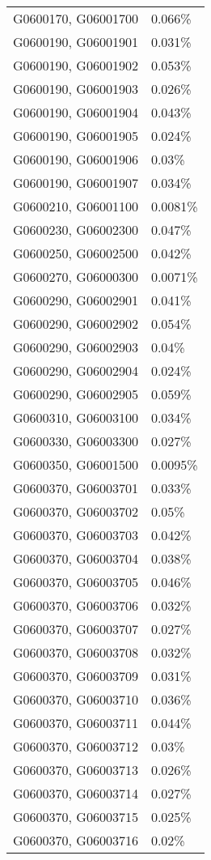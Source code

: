 \begin{longtable}[]{@{}ll@{}}
G0600170, G06001700 & 0.066\% \\
G0600190, G06001901 & 0.031\% \\
G0600190, G06001902 & 0.053\% \\
G0600190, G06001903 & 0.026\% \\
G0600190, G06001904 & 0.043\% \\
G0600190, G06001905 & 0.024\% \\
G0600190, G06001906 & 0.03\% \\
G0600190, G06001907 & 0.034\% \\
G0600210, G06001100 & 0.0081\% \\
G0600230, G06002300 & 0.047\% \\
G0600250, G06002500 & 0.042\% \\
G0600270, G06000300 & 0.0071\% \\
G0600290, G06002901 & 0.041\% \\
G0600290, G06002902 & 0.054\% \\
G0600290, G06002903 & 0.04\% \\
G0600290, G06002904 & 0.024\% \\
G0600290, G06002905 & 0.059\% \\
G0600310, G06003100 & 0.034\% \\
G0600330, G06003300 & 0.027\% \\
G0600350, G06001500 & 0.0095\% \\
G0600370, G06003701 & 0.033\% \\
G0600370, G06003702 & 0.05\% \\
G0600370, G06003703 & 0.042\% \\
G0600370, G06003704 & 0.038\% \\
G0600370, G06003705 & 0.046\% \\
G0600370, G06003706 & 0.032\% \\
G0600370, G06003707 & 0.027\% \\
G0600370, G06003708 & 0.032\% \\
G0600370, G06003709 & 0.031\% \\
G0600370, G06003710 & 0.036\% \\
G0600370, G06003711 & 0.044\% \\
G0600370, G06003712 & 0.03\% \\
G0600370, G06003713 & 0.026\% \\
G0600370, G06003714 & 0.027\% \\
G0600370, G06003715 & 0.025\% \\
G0600370, G06003716 & 0.02\% \\

\end{longtable}
